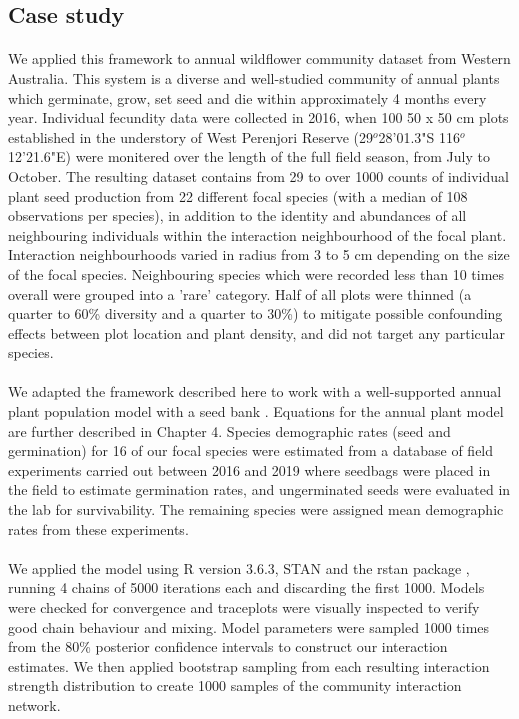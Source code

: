 \documentclass[a4,12pt]{article}
\begin{document}
    \subsection{Case study}

        \paragraph{}
        We applied this framework to annual wildflower community dataset from Western Australia. This system is a diverse and well-studied community of annual plants which germinate, grow, set seed and die within approximately 4 months every year. Individual fecundity data were collected in 2016, when 100 50 x 50 cm plots established in the understory of West Perenjori Reserve (29$^o$28'01.3"S 116$^o$12'21.6"E) were monitered over the length of the full field season, from July to October. The resulting dataset contains from 29 to over 1000 counts of individual plant seed production from 22 different focal species (with a median of 108 observations per species), in addition to the identity and abundances of all neighbouring individuals within the interaction neighbourhood of the focal plant. Interaction neighbourhoods varied in radius from 3 to 5 cm depending on the size of the focal species. Neighbouring species which were recorded less than 10 times overall were grouped into a 'rare' category. Half of all plots were thinned (a quarter to 60\% diversity and a quarter to 30\%) to mitigate possible confounding effects between plot location and plant density, and did not target any particular species.

        \paragraph{}
        We adapted the framework described here to work with a well-supported annual plant population model with a seed bank \citep{Bimler2018a}. Equations for the annual plant model are further described in Chapter 4. Species demographic rates (seed and germination) for 16 of our focal species were estimated from a database of field experiments carried out between 2016 and 2019 where seedbags were placed in the field to estimate germination rates, and ungerminated seeds were evaluated in the lab for survivability. The remaining species were assigned mean demographic rates from these experiments. 

        \paragraph{}
        We applied the model using R version 3.6.3, STAN and the rstan package \citep{R2020, Carpenter2017, Rstan2020}, running 4 chains of 5000 iterations each and discarding the first 1000. Models were checked for convergence and traceplots were visually inspected to verify good chain behaviour and mixing. Model parameters were sampled 1000 times from the 80\% posterior confidence intervals to construct our interaction estimates. We then applied bootstrap sampling from each resulting interaction strength distribution to create 1000 samples of the community interaction network.
\end{document}
